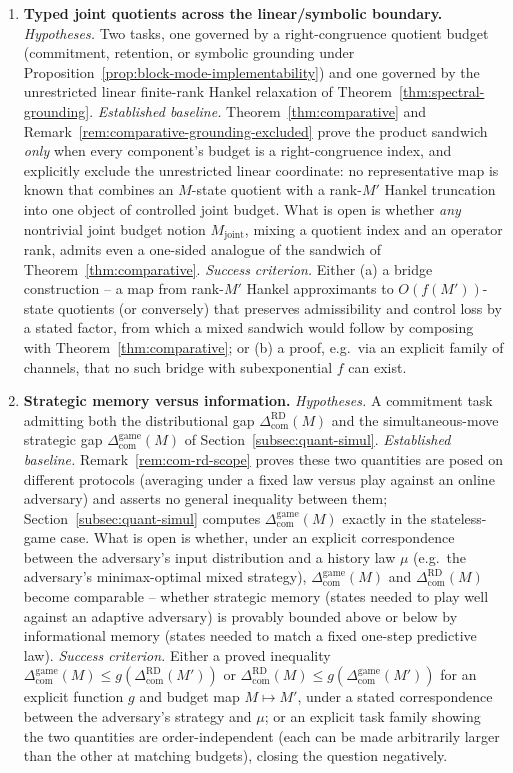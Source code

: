 \documentclass[12pt]{article}
\theoremstyle{definition}
\newcommand{\ComRD}{\Delta_{\mathrm{com}}^{\mathrm{RD}}}
\newcommand{\ComGame}{\Delta_{\mathrm{com}}^{\mathrm{game}}}
\begin{document}
\begin{enumerate}[leftmargin=2.0em]
\item \textbf{Typed joint quotients across the linear/symbolic boundary.}
\emph{Hypotheses.} Two tasks, one governed by a right-congruence quotient
budget (commitment, retention, or symbolic grounding under
Proposition~\ref{prop:block-mode-implementability}) and one governed by the
unrestricted linear finite-rank Hankel relaxation of
Theorem~\ref{thm:spectral-grounding}.
\emph{Established baseline.} Theorem~\ref{thm:comparative} and
Remark~\ref{rem:comparative-grounding-excluded} prove the product sandwich
\emph{only} when every component's budget is a right-congruence index, and
explicitly exclude the unrestricted linear coordinate: no representative
map is known that combines an $M$-state quotient with a rank-$M'$ Hankel
truncation into one object of controlled joint budget.
What is open is whether \emph{any} nontrivial joint budget notion
$M_{\mathrm{joint}}$, mixing a quotient index and an operator rank, admits
even a one-sided analogue of the sandwich of Theorem~\ref{thm:comparative}.
\emph{Success criterion.} Either (a) a bridge construction -- a map from
rank-$M'$ Hankel approximants to $O(f(M'))$-state quotients (or conversely)
that preserves admissibility and control loss by a stated factor, from which
a mixed sandwich would follow by composing with Theorem~\ref{thm:comparative};
or (b) a proof, e.g.\ via an explicit family of channels, that no such bridge
with subexponential $f$ can exist.

\item \textbf{Strategic memory versus information.}
\emph{Hypotheses.} A commitment task admitting both the distributional gap
$\ComRD(M)$ and the simultaneous-move strategic gap $\ComGame(M)$ of
Section~\ref{subsec:quant-simul}.
\emph{Established baseline.} Remark~\ref{rem:com-rd-scope} proves these two
quantities are posed on different protocols (averaging under a fixed law
versus play against an online adversary) and asserts no general inequality
between them; Section~\ref{subsec:quant-simul} computes $\ComGame(M)$ exactly
in the stateless-game case.  What is open is whether, under an explicit
correspondence between the adversary's input distribution and a history law
$\mu$ (e.g.\ the adversary's minimax-optimal mixed strategy), $\ComGame(M)$
and $\ComRD(M)$ become comparable -- whether strategic memory (states needed
to play well against an adaptive adversary) is provably bounded above or
below by informational memory (states needed to match a fixed one-step
predictive law).
\emph{Success criterion.} Either a proved inequality
$\ComGame(M)\le g(\ComRD(M'))$ or $\ComRD(M)\le g(\ComGame(M'))$ for an
explicit function $g$ and budget map $M\mapsto M'$, under a stated
correspondence between the adversary's strategy and $\mu$; or an explicit
task family showing the two quantities are order-independent (each can be
made arbitrarily larger than the other at matching budgets), closing the
question negatively.


\end{enumerate}
\end{document}
